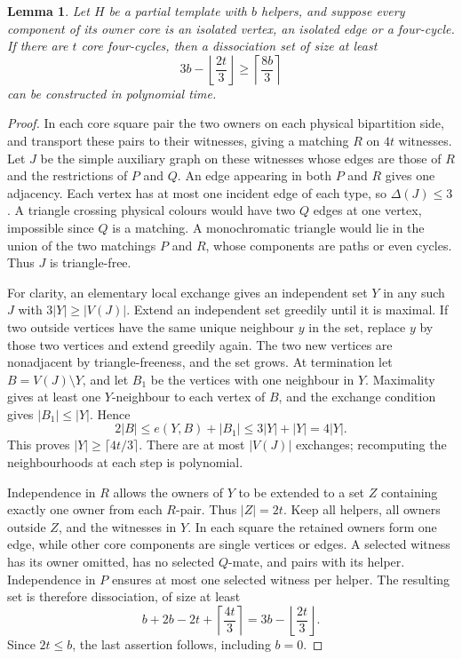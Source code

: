 \documentclass[11pt]{article}
\newtheorem{lemma}[theorem]{Lemma}
\begin{document}
\begin{lemma}\label{lem:square-core-template}
Let $H$ be a partial template with $b$ helpers, and suppose every component
of its owner core is an isolated vertex, an isolated edge or a four-cycle.
If there are $t$ core four-cycles, then a dissociation set of size at least
\[
 3b-\left\lfloor\frac{2t}{3}\right\rfloor
       \ge\left\lceil\frac{8b}{3}\right\rceil
\]
can be constructed in polynomial time.
\end{lemma}
\begin{proof}
In each core square pair the two owners on each physical bipartition side,
and transport these pairs to their witnesses, giving a matching $R$ on
$4t$ witnesses. Let $J$ be the simple auxiliary graph on these witnesses
whose edges are those of $R$ and the restrictions of $P$ and $Q$.
An edge appearing in both $P$ and $R$ gives one adjacency. Each vertex has
at most one incident edge of each type, so $\Delta(J)\le3$.
A triangle crossing physical colours would have two $Q$ edges at one vertex,
impossible since $Q$ is a matching. A monochromatic triangle would lie in
the union of the two matchings $P$ and $R$, whose components are paths or
even cycles. Thus $J$ is triangle-free.

For clarity, an elementary local exchange gives an independent set $Y$ in
any such $J$ with $3|Y|\ge|V(J)|$. Extend an independent set greedily until
it is maximal. If two outside vertices have the same unique neighbour $y$
in the set, replace $y$ by those two vertices and extend greedily again.
The two new vertices are nonadjacent by triangle-freeness, and the set grows.
At termination let $B=V(J)\setminus Y$, and let $B_1$ be the vertices with
one neighbour in $Y$. Maximality gives at least one $Y$-neighbour to each
vertex of $B$, and the exchange condition gives $|B_1|\le|Y|$. Hence
\[
 2|B|\le e(Y,B)+|B_1|\le3|Y|+|Y|=4|Y|.
\]
This proves $|Y|\ge\lceil4t/3\rceil$. There are at most $|V(J)|$ exchanges;
recomputing the neighbourhoods at each step is polynomial.

Independence in $R$ allows the owners of $Y$ to be extended to a set $Z$
containing exactly one owner from each $R$-pair. Thus $|Z|=2t$.
Keep all helpers, all owners outside $Z$, and the witnesses in $Y$.
In each square the retained owners form one edge, while other core
components are single vertices or edges. A selected witness has its owner
omitted, has no selected $Q$-mate, and pairs with its helper.
Independence in $P$ ensures at most one selected witness per helper.
The resulting set is therefore dissociation, of size at least
\[
 b+2b-2t+\left\lceil\frac{4t}{3}\right\rceil
       =3b-\left\lfloor\frac{2t}{3}\right\rfloor.
\]
Since $2t\le b$, the last assertion follows, including $b=0$.
\end{proof}
\end{document}
